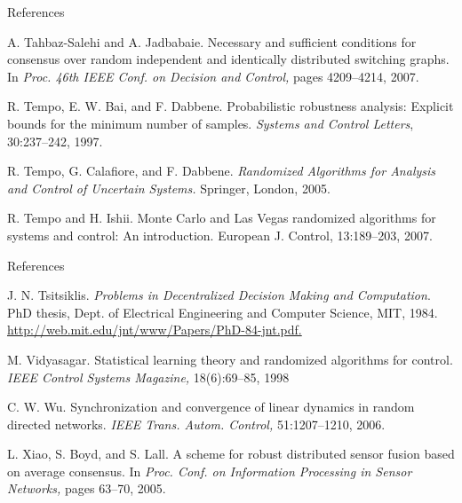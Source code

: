 \documentclass[xcolor={dvipsnames}]{beamer}
\begin{document}
\begin{thebibliography}{30}
\begin{frame}{References}
		
		 A. Tahbaz-Salehi and A. Jadbabaie. Necessary and sufficient conditions for consensus over random independent and identically distributed switching graphs. In \textit{Proc. 46th IEEE Conf. on Decision and Control,} pages 4209–4214, 2007.
		
		
		 R. Tempo, E. W. Bai, and F. Dabbene. Probabilistic robustness analysis: Explicit bounds for the minimum number of samples. \textit{Systems and Control Letters}, 30:237–242, 1997.
		
		
		  R. Tempo, G. Calafiore, and F. Dabbene. \textit{Randomized Algorithms for Analysis and Control of Uncertain Systems.} Springer, London, 2005.
		
		
		 R. Tempo and H. Ishii. Monte Carlo and Las Vegas randomized algorithms for systems and control: An introduction. European J. Control, 13:189–203, 2007.
		
	\end{frame}

	\begin{frame}{References}
	
		 J. N. Tsitsiklis. \textit{Problems in Decentralized Decision Making and Computation}. PhD thesis, Dept. of Electrical Engineering and Computer Science, MIT, 1984. \href{http://web.mit.edu/jnt/www/Papers/PhD-84-jnt.pdf.}{http://web.mit.edu/jnt/www/Papers/PhD-84-jnt.pdf.}
		
		
		 M. Vidyasagar. Statistical learning theory and randomized algorithms for control. \textit{IEEE Control Systems Magazine,} 18(6):69–85, 1998
		
		
		 C. W. Wu. Synchronization and convergence of linear dynamics in random directed networks. \textit{IEEE Trans. Autom. Control,} 51:1207–1210, 2006.
		
		
		 L. Xiao, S. Boyd, and S. Lall. A scheme for robust distributed sensor fusion based on average consensus. In \textit{Proc. Conf. on Information Processing in Sensor Networks,} pages 63–70, 2005.
			
	\end{frame}
\end{thebibliography}
\end{document}

